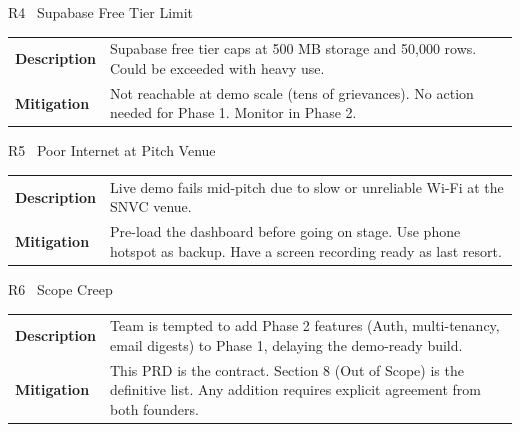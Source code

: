 \documentclass[11pt, a4paper]{article}
\begin{document}
\vspace{0.6em}

\begin{riskcard}{R4 \ Supabase Free Tier Limit}{\vlow}
\begin{tabularx}{\linewidth}{lX}
\textbf{Description} & Supabase free tier caps at 500 MB storage and 50,000 rows. Could be exceeded with heavy use. \\[3pt]
\textbf{Mitigation}  & Not reachable at demo scale (tens of grievances). No action needed for Phase 1. Monitor in Phase 2. \\
\end{tabularx}
\end{riskcard}

\vspace{0.6em}

\begin{riskcard}{R5 \ Poor Internet at Pitch Venue}{\medium}
\begin{tabularx}{\linewidth}{lX}
\textbf{Description} & Live demo fails mid-pitch due to slow or unreliable Wi-Fi at the SNVC venue. \\[3pt]
\textbf{Mitigation}  & Pre-load the dashboard before going on stage. Use phone hotspot as backup. Have a screen recording ready as last resort. \\
\end{tabularx}
\end{riskcard}

\vspace{0.6em}

\begin{riskcard}{R6 \ Scope Creep}{\high}
\begin{tabularx}{\linewidth}{lX}
\textbf{Description} & Team is tempted to add Phase 2 features (Auth, multi-tenancy, email digests) to Phase 1, delaying the demo-ready build. \\[3pt]
\textbf{Mitigation}  & This PRD is the contract. Section 8 (Out of Scope) is the definitive list. Any addition requires explicit agreement from both founders. \\
\end{tabularx}
\end{riskcard}

\newpage

\end{document}
